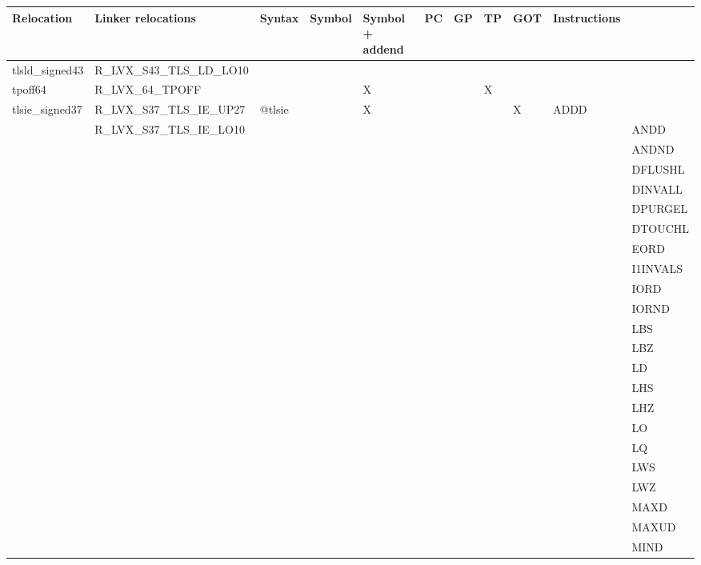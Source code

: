 {\tiny
\begin{tabular}{|l|l|l|l|l|l|l|l|l|l|l|} \hline
\textsf{Relocation} & \textsf{Linker relocations} & \textsf{Syntax} & \textsf{Symbol} & \textsf{Symbol + addend} & \textsf{PC} & \textsf{GP} & \textsf{TP} & \textsf{GOT} & \textsf{Instructions} \\
\hline
\textsf{tlsld\_signed43} & \textsf{R\_LVX\_S43\_TLS\_LD\_LO10} & & & & & & & & & \\
\hline
\textsf{tpoff64} & \textsf{R\_LVX\_64\_TPOFF} & \textsf{} & \textsf{} & \textsf{X} & \textsf{} & \textsf{} & \textsf{X} & \textsf{} & \textsf{} \\
\hline
\textsf{tlsie\_signed37} & \textsf{R\_LVX\_S37\_TLS\_IE\_UP27} & \textsf{@tlsie} & \textsf{} & \textsf{X} & \textsf{} & \textsf{} & \textsf{} & \textsf{X} & \textsf{ADDD} \\
 & \textsf{R\_LVX\_S37\_TLS\_IE\_LO10} & & & & & & & & & \textsf{ANDD} \\
 & & & & & & & & & & \textsf{ANDND} \\
 & & & & & & & & & & \textsf{DFLUSHL} \\
 & & & & & & & & & & \textsf{DINVALL} \\
 & & & & & & & & & & \textsf{DPURGEL} \\
 & & & & & & & & & & \textsf{DTOUCHL} \\
 & & & & & & & & & & \textsf{EORD} \\
 & & & & & & & & & & \textsf{I1INVALS} \\
 & & & & & & & & & & \textsf{IORD} \\
 & & & & & & & & & & \textsf{IORND} \\
 & & & & & & & & & & \textsf{LBS} \\
 & & & & & & & & & & \textsf{LBZ} \\
 & & & & & & & & & & \textsf{LD} \\
 & & & & & & & & & & \textsf{LHS} \\
 & & & & & & & & & & \textsf{LHZ} \\
 & & & & & & & & & & \textsf{LO} \\
 & & & & & & & & & & \textsf{LQ} \\
 & & & & & & & & & & \textsf{LWS} \\
 & & & & & & & & & & \textsf{LWZ} \\
 & & & & & & & & & & \textsf{MAXD} \\
 & & & & & & & & & & \textsf{MAXUD} \\
 & & & & & & & & & & \textsf{MIND} \\

\end{tabular}}
